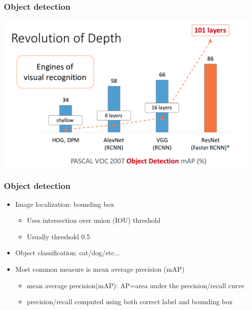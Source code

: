 \documentclass{beamer}
\begin{document}
\begin{frame}
	\frametitle{Object detection}
	\begin{center}
        \includegraphics[width=\textwidth]{figs/object-detect.png}
    \end{center}
	

\end{frame}
\begin{frame}
	\frametitle{Object detection}
\begin{itemize}
	\item Image localization: bounding box
	\begin{itemize}
		\item Uses intersection over union (IOU) threshold
		\item Usually threshold 0.5
	\end{itemize}
	
	\item Object classification: cat/dog/etc...
	\item Most common measure is mean average precision (mAP)
	\begin{itemize}
		\item mean average precision(mAP): AP=area under the precision/recall curve
		\item precision/recall computed using both correct label and bounding box
	\end{itemize}
\end{itemize}
\end{frame}
\end{document}
